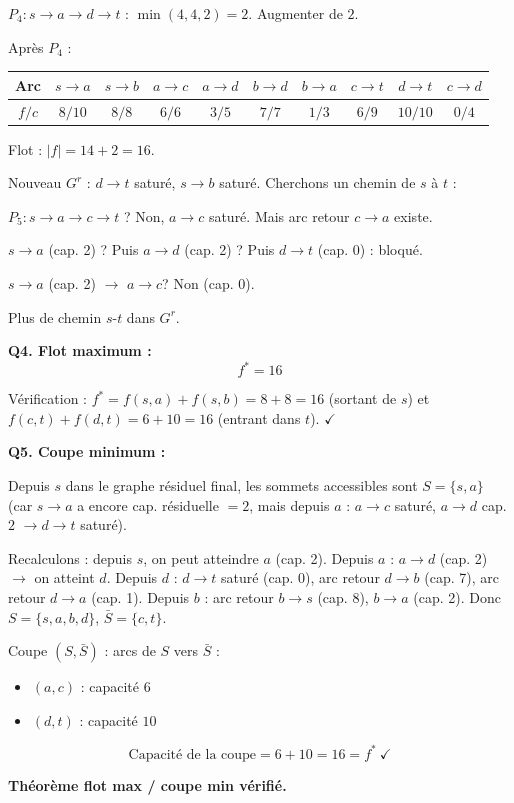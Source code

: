 \documentclass[12pt,a4paper]{article}
\begin{document}
\begin{correction}
$P_4 : s \to a \to d \to t$ : $\min(4, 4, 2) = 2$. Augmenter de $2$.

Apr\`es $P_4$ :

\begin{center}
\begin{tabular}{|c|c|c|c|c|c|c|c|c|c|}
\hline
Arc & $s\!\to\!a$ & $s\!\to\!b$ & $a\!\to\!c$ & $a\!\to\!d$ & $b\!\to\!d$ & $b\!\to\!a$ & $c\!\to\!t$ & $d\!\to\!t$ & $c\!\to\!d$ \\\hline
$f/c$ & $8/10$ & $8/8$ & $6/6$ & $3/5$ & $7/7$ & $1/3$ & $6/9$ & $10/10$ & $0/4$ \\\hline
\end{tabular}
\end{center}

Flot : $|f| = 14 + 2 = 16$.

\medskip
Nouveau $G^r$ : $d \to t$ satur\'e, $s \to b$ satur\'e. Cherchons un chemin de $s$ \`a $t$ :

$P_5 : s \to a \to c \to t$ ? Non, $a \to c$ satur\'e. Mais arc retour $c \to a$ existe.

$s \to a$ (cap. 2) ? Puis $a \to d$ (cap. 2) ? Puis $d \to t$ (cap. 0) : bloqu\'e.

$s \to a$ (cap. 2) $\to$ $a \to c$? Non (cap. $0$).

Plus de chemin $s$-$t$ dans $G^r$.

\medskip
\textbf{Q4. Flot maximum :}
$$\boxed{f^* = 16}$$

V\'erification : $f^* = f(s,a) + f(s,b) = 8 + 8 = 16$ (sortant de $s$) et $f(c,t) + f(d,t) = 6 + 10 = 16$ (entrant dans $t$). $\checkmark$

\medskip
\textbf{Q5. Coupe minimum :}

Depuis $s$ dans le graphe r\'esiduel final, les sommets accessibles sont $S = \{s, a\}$ (car $s \to a$ a encore cap. r\'esiduelle $= 2$, mais depuis $a$ : $a \to c$ satur\'e, $a \to d$ cap. $2$ $\to d \to t$ satur\'e).

Recalculons : depuis $s$, on peut atteindre $a$ (cap. 2). Depuis $a$ : $a \to d$ (cap. 2) $\to$ on atteint $d$. Depuis $d$ : $d \to t$ satur\'e (cap. 0), arc retour $d \to b$ (cap. 7), arc retour $d \to a$ (cap. 1). Depuis $b$ : arc retour $b \to s$ (cap. 8), $b \to a$ (cap. 2). Donc $S = \{s, a, b, d\}$, $\bar{S} = \{c, t\}$.

Coupe $(S, \bar{S})$ : arcs de $S$ vers $\bar{S}$ :
\begin{itemize}[nosep]
    \item $(a, c)$ : capacit\'e $6$
    \item $(d, t)$ : capacit\'e $10$
\end{itemize}

$$\text{Capacit\'e de la coupe} = 6 + 10 = 16 = f^*\ \checkmark$$

\textbf{Th\'eor\`eme flot max / coupe min v\'erifi\'e.}
\end{correction}
\end{document}
